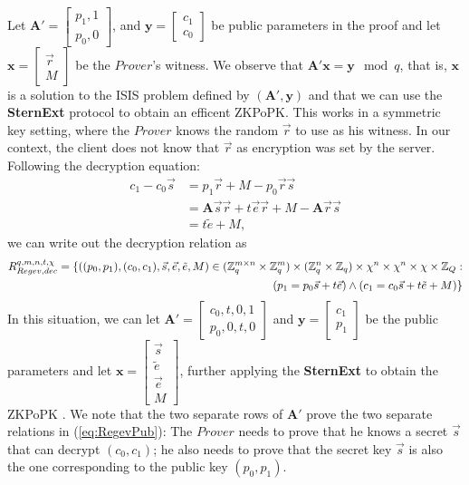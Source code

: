 Let $\mathbf{A}' = \begin{bmatrix}
  p_1, 1\\
  p_0, 0
\end{bmatrix}
$, and $\mathbf{y} = \begin{bmatrix}
  c_1\\c_0
\end{bmatrix}$ be public parameters in the proof and
let $\mathbf{x} = \begin{bmatrix}
  \vec{r}\\
  M
\end{bmatrix}$ be the $Prover$'s witness. We observe that
$\mathbf{A'}\mathbf{x}= \mathbf{y} \mod q$, that is, $\mathbf{x}$ is a solution
to the ISIS problem defined by $(\mathbf{A'},\mathbf{y})$ and that we can use
the \textbf{SternExt} protocol to obtain an efficent
ZKPoPK. This works in a symmetric key setting, where the $Prover$ knows the
random $\vec{r}$ to use as his witness. In our context, the client does not know
that $\vec{r}$ as encryption was set by the server. Following the decryption
equation:
\begin{align*}
  c_1 - c_0\vec{s} &= p_1\vec{r} + M - p_0\vec{r}\vec{s} \\
                   &= \mathbf{A}\vec{s}\vec{r} + t\vec{e}\vec{r} + M - \mathbf{A}\vec{r}\vec{s}\\
                   &= t\tilde{e} + M,
\end{align*}
we can write out the decryption relation as
\begin{align}
  \label{eq:RegevPub}
  R_{Regev,dec}^{q,m,n,t,\chi} = \{ ((p_0,p_1),(c_0,c_1),\vec{s},\vec{e},\tilde{e}, M) \in (\mathbb{Z}_q^{m \times n} \times \mathbb{Z}_q^{m})
  \times (\mathbb{Z}_q^n \times \mathbb{Z}_q) \times \chi^n \times \chi^n \times \chi \times \mathbb{Z}_Q :\\ \nonumber
  (p_1 = p_0\vec{s} + t\vec{e}) \land (c_1 = c_0\vec{s} + t\tilde{e} + M) \}
\end{align}
In this situation, we can let $\mathbf{A'} = \begin{bmatrix}
  c_0, t, 0 , 1 \\p_0, 0, t, 0
\end{bmatrix}
$
and $\mathbf{y} = \begin{bmatrix}
  c_1\\p_1
\end{bmatrix}$
be the public parameters and let $\mathbf{x} = \begin{bmatrix}
  \vec{s}\\ \tilde{e}\\ \vec{e}\\ M
\end{bmatrix}
$, further applying the \textbf{SternExt} to obtain the ZKPoPK  . We note that the two separate rows of $\mathbf{A'}$ prove the two
separate relations in (\ref{eq:RegevPub}): The $Prover$ needs to prove that he knows a secret $\vec{s}$ that can decrypt
$(c_0,c_1)$; he also needs to prove that the secret key $\vec{s}$ is also the one corresponding to the public key
$(p_0, p_1)$.


